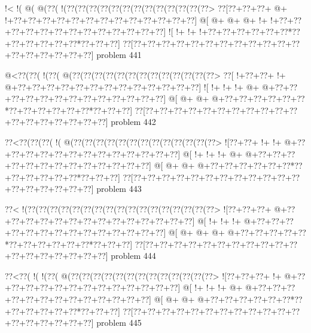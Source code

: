 \vbox{\vbox{\goo
\- !<\- !(\- @(\- @(\0??(\- !(\0??(\0??(\0??(\0??(\0??(\0??(\0??(\0??(\0??(\0??(\0??(\0??(\0??>
\0??[\0??+\0??+\0??+\- @+\- !+\0??+\0??+\0??+\0??+\0??+\0??+\0??+\0??+\0??+\0??+\0??+\0??+\0??]
\- @[\- @+\- @+\- @+\- !+\- !+\0??+\0??+\0??+\0??+\0??+\0??+\0??+\0??+\0??+\0??+\0??+\0??+\0??]
\- ![\- !+\- !+\- !+\0??+\0??+\0??+\0??+\0??+\0??*\0??+\0??+\0??+\0??+\0??+\0??*\0??+\0??+\0??]
\0??[\0??+\0??+\0??+\0??+\0??+\0??+\0??+\0??+\0??+\0??+\0??+\0??+\0??+\0??+\0??+\0??+\0??+\0??]
}
\hfil problem 441\hfil\break
}



\vbox{\vbox{\goo
\- @<\0??(\0??(\- !(\0??(\- @(\0??(\0??(\0??(\0??(\0??(\0??(\0??(\0??(\0??(\0??(\0??(\0??(\0??>
\0??[\- !+\0??+\0??+\- !+\- @+\0??+\0??+\0??+\0??+\0??+\0??+\0??+\0??+\0??+\0??+\0??+\0??+\0??]
\- ![\- !+\- !+\- !+\- @+\- @+\0??+\0??+\0??+\0??+\0??+\0??+\0??+\0??+\0??+\0??+\0??+\0??+\0??]
\- @[\- @+\- @+\- @+\0??+\0??+\0??+\0??+\0??+\0??*\0??+\0??+\0??+\0??+\0??+\0??*\0??+\0??+\0??]
\0??[\0??+\0??+\0??+\0??+\0??+\0??+\0??+\0??+\0??+\0??+\0??+\0??+\0??+\0??+\0??+\0??+\0??+\0??]
}
\hfil problem 442\hfil\break
}



\vbox{\vbox{\goo
\0??<\0??(\0??(\0??(\- !(\- @(\0??(\0??(\0??(\0??(\0??(\0??(\0??(\0??(\0??(\0??(\0??(\0??(\0??>
\- ![\0??+\0??+\- !+\- !+\- @+\0??+\0??+\0??+\0??+\0??+\0??+\0??+\0??+\0??+\0??+\0??+\0??+\0??]
\- @[\- !+\- !+\- !+\- @+\- @+\0??+\0??+\0??+\0??+\0??+\0??+\0??+\0??+\0??+\0??+\0??+\0??+\0??]
\- @[\- @+\- @+\- @+\0??+\0??+\0??+\0??+\0??+\0??*\0??+\0??+\0??+\0??+\0??+\0??*\0??+\0??+\0??]
\0??[\0??+\0??+\0??+\0??+\0??+\0??+\0??+\0??+\0??+\0??+\0??+\0??+\0??+\0??+\0??+\0??+\0??+\0??]
}
\hfil problem 443\hfil\break
}



\vbox{\vbox{\goo
\0??<\- !(\0??(\0??(\0??(\0??(\0??(\0??(\0??(\0??(\0??(\0??(\0??(\0??(\0??(\0??(\0??(\0??(\0??>
\- ![\0??+\0??+\0??+\- @+\0??+\0??+\0??+\0??+\0??+\0??+\0??+\0??+\0??+\0??+\0??+\0??+\0??+\0??]
\- @[\- !+\- !+\- !+\- @+\0??+\0??+\0??+\0??+\0??+\0??+\0??+\0??+\0??+\0??+\0??+\0??+\0??+\0??]
\- @[\- @+\- @+\- @+\- @+\0??+\0??+\0??+\0??+\0??*\0??+\0??+\0??+\0??+\0??+\0??*\0??+\0??+\0??]
\0??[\0??+\0??+\0??+\0??+\0??+\0??+\0??+\0??+\0??+\0??+\0??+\0??+\0??+\0??+\0??+\0??+\0??+\0??]
}
\hfil problem 444\hfil\break
}



\vbox{\vbox{\goo
\0??<\0??(\- !(\- !(\0??(\- @(\0??(\0??(\0??(\0??(\0??(\0??(\0??(\0??(\0??(\0??(\0??(\0??(\0??>
\- ![\0??+\0??+\0??+\- !+\- @+\0??+\0??+\0??+\0??+\0??+\0??+\0??+\0??+\0??+\0??+\0??+\0??+\0??]
\- @[\- !+\- !+\- !+\- @+\- @+\0??+\0??+\0??+\0??+\0??+\0??+\0??+\0??+\0??+\0??+\0??+\0??+\0??]
\- @[\- @+\- @+\- @+\0??+\0??+\0??+\0??+\0??+\0??*\0??+\0??+\0??+\0??+\0??+\0??*\0??+\0??+\0??]
\0??[\0??+\0??+\0??+\0??+\0??+\0??+\0??+\0??+\0??+\0??+\0??+\0??+\0??+\0??+\0??+\0??+\0??+\0??]
}
\hfil problem 445\hfil\break
}



